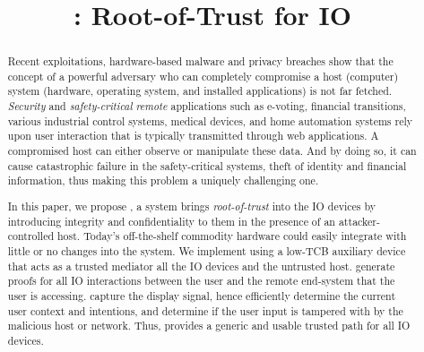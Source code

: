 

\newif\ifpaper
\papertrue


\newif\ifdesperatetime

\graphicspath{{images/}}


\title{\name: Root-of-Trust for IO}

\maketitle

\begin{abstract}
 
Recent exploitations, hardware-based malware and privacy breaches show that the concept of a powerful adversary who can completely compromise a host (computer) system (hardware, operating system, and installed applications) is not far fetched. \emph{Security} and \emph{safety-critical} \emph{remote} applications such as e-voting, financial transitions, various industrial control systems, medical devices, and home automation systems rely upon user interaction that is typically transmitted through web applications. A compromised host can either observe or manipulate these data. And by doing so, it can cause catastrophic failure in the safety-critical systems, theft of identity and financial information, thus making this problem a uniquely challenging one.

In this paper, we propose \name, a system brings \emph{root-of-trust} into the IO devices by introducing integrity and confidentiality to them in the presence of an attacker-controlled host. Today's off-the-shelf commodity hardware could easily integrate \name with little or no changes into the system. We implement \name using a low-TCB auxiliary device that acts as a trusted mediator all the IO devices and the untrusted host. \name generate proofs for all IO interactions between the user and the remote end-system that the user is accessing. \name capture the display signal, hence efficiently determine the current user context and intentions, and determine if the user input is tampered with by the malicious host or network. Thus, \name provides a generic and usable trusted path for all IO devices.

\end{abstract}









%

%



%


\appendix




